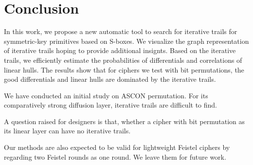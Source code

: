 \section{Conclusion\label{sec:conclusion}}

In this work, we propose a new automatic tool to search for iterative trails for symmetric-key primitives based on S-boxes. We visualize the graph representation of iterative trails hoping to provide additional insignts. Based on the iterative trails, we efficiently estimate the probabilities of differentials and correlations of linear hulls. The results show that for ciphers we test with bit permutations, the good differentials and linear hulls are dominated by the iterative trails. 

We have conducted an initial study on ASCON permutation. For its comparatively strong diffusion layer, iterative trails are difficult to find. 

A question raised for designers is that, whether a cipher with bit permutation as its linear layer can have no iterative trails. 

Our methods are also expected to be valid for lightweight Feistel ciphers by regarding two Feistel rounds as one round. We leave them for future work. 

